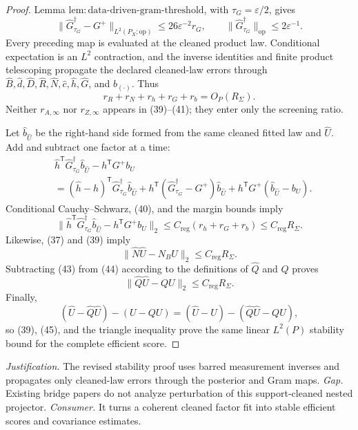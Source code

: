 \documentclass{article}
\begin{document}
\begin{proof}
Lemma \(\mathrm{lem{:}data\mbox{-}driven\mbox{-}gram\mbox{-}threshold}\), with \(\tau_G=\varepsilon/2\), gives
\[
 \|\widehat G_{\tau_G}^{\dagger}-G^+\|_{L^2(P_X;\mathrm{op})}
 \leq26\varepsilon^{-2}r_G,\qquad
 \|\widehat G_{\tau_G}^{\dagger}\|_{\mathrm{op}}\leq2\varepsilon^{-1}. \tag{40}
\]
Every preceding map is evaluated at the cleaned product law.  Conditional expectation is an \(L^2\) contraction, and the inverse identities and finite product telescoping propagate the declared cleaned-law errors through \(\widehat B,\widehat d,\widehat D,\widehat R,\widehat N,\widehat c,\widehat h,\widehat G\), and \(\widehat b_{(\cdot)}\).  Thus
\[
 r_R+r_N+r_h+r_G+r_b=O_P(R_\Sigma). \tag{41}
\]
Neither \(r_{A,\infty}\) nor \(r_{Z,\infty}\) appears in (39)--(41); they enter only the screening ratio.

Let \(\widehat b_{\widehat U}\) be the right-hand side formed from the same cleaned fitted law and \(\widehat U\).  Add and subtract one factor at a time:
\[
\begin{aligned}
 &\widehat h^{\mathsf T}\widehat G_{\tau_G}^{\dagger}\widehat b_{\widehat U}
   -h^{\mathsf T}G^+b_U\\
 &=(\widehat h-h)^{\mathsf T}\widehat G_{\tau_G}^{\dagger}\widehat b_{\widehat U}
   +h^{\mathsf T}(\widehat G_{\tau_G}^{\dagger}-G^+)\widehat b_{\widehat U}
   +h^{\mathsf T}G^+(\widehat b_{\widehat U}-b_U).
\end{aligned} \tag{42}
\]
Conditional Cauchy--Schwarz, (40), and the margin bounds imply
\[
 \|\widehat h^{\mathsf T}\widehat G_{\tau_G}^{\dagger}\widehat b_{\widehat U}
   -h^{\mathsf T}G^+b_U\|_2
 \leq C_{\mathrm{reg}}(r_h+r_G+r_b)
 \leq C_{\mathrm{reg}}R_\Sigma. \tag{43}
\]
Likewise, (37) and (39) imply
\[
 \|\widehat N\widehat U-N_BU\|_2
 \leq C_{\mathrm{reg}}R_\Sigma. \tag{44}
\]
Subtracting (43) from (44) according to the definitions of \(\widehat Q\) and \(Q\) proves
\[
 \|\widehat Q\widehat U-QU\|_2\leq C_{\mathrm{reg}}R_\Sigma. \tag{45}
\]
Finally,
\[
(\widehat U-\widehat Q\widehat U)-(U-QU)
=(\widehat U-U)-(\widehat Q\widehat U-QU),
\]
so (39), (45), and the triangle inequality prove the same linear \(L^2(P)\) stability bound for the complete efficient score.
\end{proof}
\par\smallskip\noindent \textit{Justification.} The revised stability proof uses barred measurement inverses and propagates only cleaned-law errors through the posterior and Gram maps. \textit{Gap.} Existing bridge papers do not analyze perturbation of this support-cleaned nested projector. \textit{Consumer.} It turns a coherent cleaned factor fit into stable efficient scores and covariance estimates.
\end{document}
